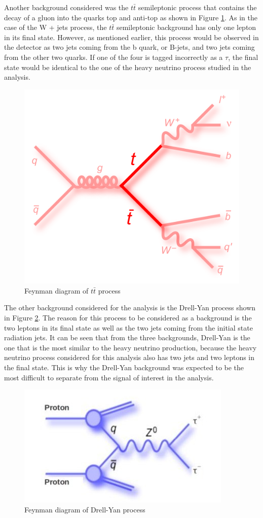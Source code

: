 Another background considered was the $t\bar{t}$ semileptonic process that contains the decay of a gluon into the quarks top and anti-top as shown in Figure \ref{fig: ttbar_background}. As in the case of the W + jets process, the $t\bar{t}$ semileptonic background has only one lepton in its final state. However, as mentioned earlier, this process would be observed in the detector as two jets coming from the b quark, or B-jets, and two jets coming from the other two quarks. If one of the four is tagged incorrectly as a $\tau$, the final state would be identical to the one of the heavy neutrino process studied in the analysis.


\begin{figure}[H]
\centering
\includegraphics[width = 0.7\linewidth]{ttbar}
\caption{Feynman diagram of $t\bar{t}$ process}
\label{fig: ttbar_background}
\end{figure}

The other background considered for the analysis is the Drell-Yan process shown in Figure \ref{fig: DY_background}. The reason for this process to be considered as a background is the two leptons in its final state as well as the two jets coming from the initial state radiation jets. It can be seen that from the three backgrounds, Drell-Yan is the one that is the most similar to the heavy neutrino production, because the heavy neutrino process considered for this analysis also has two jets and two leptons in the final state. This is why the Drell-Yan background was expected to be the most difficult to separate from the signal of interest in the analysis.

\begin{figure}[H]
\centering
\includegraphics[width = 0.7\linewidth]{Drell-Yan}
\caption{Feynman diagram of Drell-Yan process}
\label{fig: DY_background}
\end{figure}